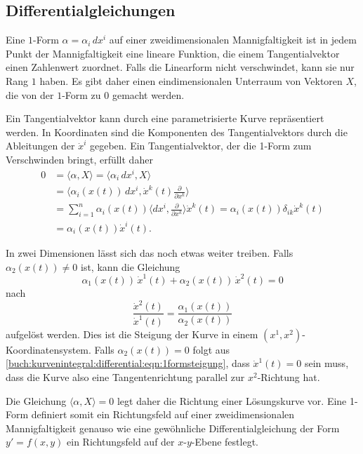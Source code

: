 %
%
\subsection{Differentialgleichungen}
Eine $1$-Form $\alpha = \alpha_i\,dx^i$ auf einer zweidimensionalen
Mannigfaltigkeit ist in jedem Punkt der Mannigfaltigkeit eine lineare
Funktion, die einem Tangentialvektor einen Zahlenwert zuordnet.
Falls die Linearform nicht verschwindet, kann sie nur Rang $1$
haben.
Es gibt daher einen eindimensionalen Unterraum von Vektoren $X$, die
von der $1$-Form zu $0$ gemacht werden.

Ein Tangentialvektor kann durch eine parametrisierte Kurve repräsentiert
werden.
In Koordinaten sind die Komponenten des Tangentialvektors durch
die Ableitungen der $\dot{x}^i$ gegeben.
Ein Tangentialvektor, der die 1-Form zum Verschwinden bringt, erfüllt
daher
\begin{align*}
0
&=
\langle\alpha, X\rangle
=
\langle
\alpha_i\,dx^i,
X
\rangle
\\
&=
\biggl\langle
\alpha_i(x(t))\,dx^i,
\dot{x}^k(t)\frac{\partial}{\partial x^k}
\biggr\rangle
\\
&=
\sum_{i=1}^n
\alpha_i(x(t))
\biggl\langle
dx^i,\frac{\partial}{\partial x^k}
\biggr\rangle
\dot{x}^k(t)
=
\alpha_i(x(t))\delta_{ik}\dot{x}^k(t)
\\
&=
\alpha_i(x(t))\dot{x}^i(t).
\end{align*}

In zwei Dimensionen lässt sich das noch etwas weiter treiben.
Falls $\alpha_2(x(t))\ne 0$ ist, kann die Gleichung
\begin{equation}
\alpha_1(x(t))\, \dot{x}^1(t) + \alpha_2(x(t))\,\dot{x}^2(t) = 0
\label{buch:kurvenintegral:differential:eqn:1formsteigung}
\end{equation}
nach
\[
\frac{\dot{x}^2(t)}{\dot{x}^1(t)}
=
\frac{\alpha_1(x(t))}{\alpha_2(x(t))}
\]
aufgelöst werden.
Dies ist die Steigung der Kurve in einem 
$(x^1,x^2)$-Koordinatensystem.
Falls $\alpha_2(x(t))=0$ folgt aus
\eqref{buch:kurvenintegral:differential:eqn:1formsteigung}, dass
$\dot{x}^1(t)=0$ sein muss, dass die Kurve also eine Tangentenrichtung
parallel zur $x^2$-Richtung hat.

Die Gleichung $\langle\alpha,X\rangle=0$ legt daher die Richtung
einer Lösungskurve vor.
Eine 1-Form definiert somit ein Richtungsfeld auf einer zweidimensionalen
Mannigfaltigkeit genauso wie eine gewöhnliche Differentialgleichung
der Form $y'=f(x,y)$ ein Richtungsfeld auf der $x$-$y$-Ebene festlegt.

